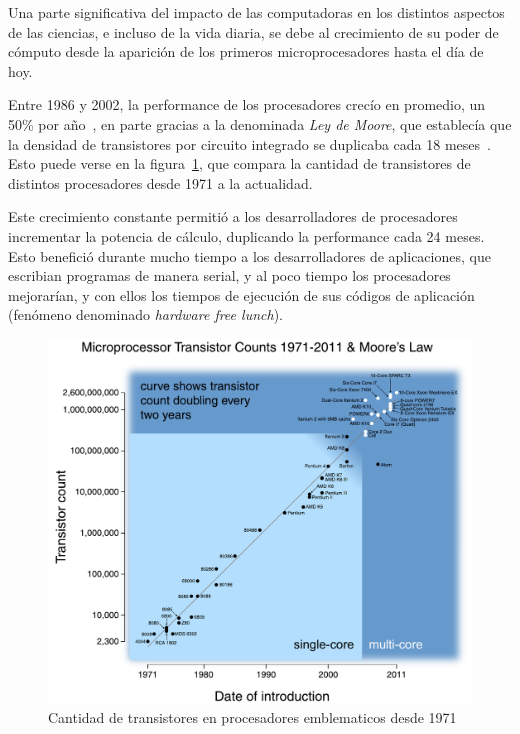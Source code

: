 Una parte significativa del impacto de las computadoras en los distintos aspectos de las
ciencias, e incluso de la vida diaria, se debe al crecimiento de su
poder de c\'omputo desde la aparici\'on de los primeros microprocesadores hasta el
d\'ia de hoy.

Entre 1986 y 2002, la performance de los procesadores crec\'io en promedio, un 50\%
por a\~no~\cite{Pacheco}, en parte gracias a la denominada \textit{Ley de Moore}, que
establec\'ia que la densidad de transistores por circuito integrado se duplicaba
cada 18 meses~\cite{HennessyPatterson}. Esto puede verse en la figura~\ref{moore-law},
que compara la cantidad de transistores de distintos procesadores desde 1971 a la actualidad.

Este crecimiento constante permiti\'o a los desarrolladores de procesadores incrementar la potencia
de c\'alculo, duplicando la performance cada 24 meses. Esto benefici\'o durante mucho tiempo a los desarrolladores
de aplicaciones, que escribian programas de manera serial, y al poco tiempo los procesadores
mejorar\'ian, y con ellos los tiempos de ejecuci\'on de sus c\'odigos de aplicaci\'on (fen\'omeno denominado
\textit{hardware free lunch}).

\begin{figure}[htbp]
   \centering
   \includegraphics[width=\textwidth]{images/moore-law.pdf}
   \caption{Cantidad de transistores en procesadores emblematicos desde 1971}
   \label{moore-law}
\end{figure}

